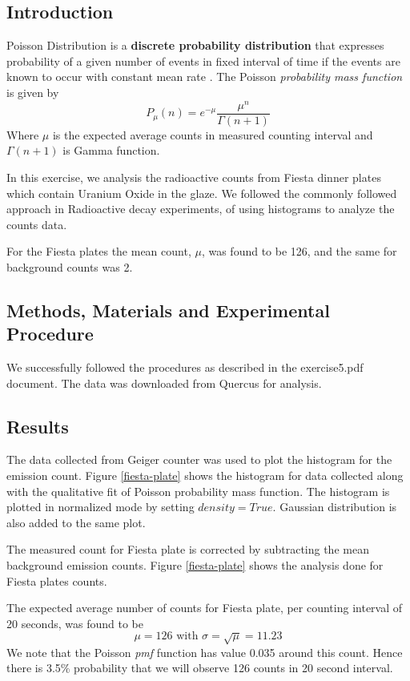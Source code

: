 \documentclass[letterpaper,12pt]{article}
\begin{document}
\subsection{Introduction}

Poisson Distribution is a \textbf{discrete probability distribution} that expresses probability of a given number 
of events in fixed interval of time if the events are known to occur with constant mean rate \cite{lab-manual-ex5}.
The Poisson \emph{probability mass function} is given by
$$P_{\mu}(n) = e^{-\mu}\frac{\mu^n}{\Gamma(n+1)}$$
Where $\mu$ is the expected average counts in measured counting interval and $\Gamma(n+1)$ is Gamma function. 

In this exercise, we analysis the radioactive counts from Fiesta dinner plates which contain Uranium Oxide in the glaze.
We followed the commonly followed approach in Radioactive decay experiments, of using histograms to analyze the counts data.

For the Fiesta plates the mean count, $\mu$, was found to be 126, and the same for background counts was 2.

\subsection{Methods, Materials and Experimental Procedure}

We successfully followed the procedures as described in the exercise5.pdf \cite{lab-manual-ex5}
document. The data was downloaded from Quercus for analysis.

\subsection{Results}

The data collected from Geiger counter was used to plot the histogram for the emission count. 
Figure \ref{fiesta-plate} shows the histogram for data collected along with the qualitative
fit of Poisson probability mass function. The histogram is plotted in normalized mode by setting $density=True$.
Gaussian distribution is also added to the same plot.

The measured count for Fiesta plate is corrected by subtracting the mean background emission counts. Figure \ref{fiesta-plate} shows the analysis done for Fiesta plates counts.

The expected average number of counts for Fiesta plate, per counting interval of 20 seconds, was found to be
$$\mu=126\text{\ \ \ \ with \ \ \ } \sigma = \sqrt{\mu} = 11.23$$
We note that the Poisson \emph{pmf} function has value 0.035 around this count. Hence there is 3.5\% probability that we will observe 
126 counts in 20 second interval. 
\end{document}
